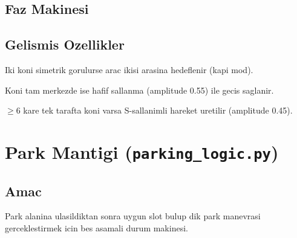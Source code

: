 \documentclass[a4paper,12pt]{article}
\begin{document}
\subsection{Faz Makinesi}

\begin{center}
\end{center}

\subsection{Gelismis Ozellikler}

\begin{description}[leftmargin=2em]
  \item[Baslangic kapisi] Iki koni simetrik gorulurse arac ikisi arasina
        hedeflenir (kapi mod).
  \item[Center weave] Koni tam merkezde ise hafif sallanma
        (amplitude 0.55) ile gecis saglanir.
  \item[S-weave] $\geq 6$ kare tek tarafta koni varsa S-sallanimli
        hareket uretilir (amplitude 0.45).
\end{description}

\section{Park Mantigi (\texttt{parking\_logic.py})}

\subsection{Amac}

Park alanina ulasildiktan sonra uygun slot bulup dik park manevrasi
gerceklestirmek icin bes asamali durum makinesi.
\end{document}
